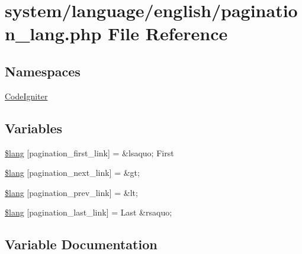 \hypertarget{pagination__lang_8php}{}\section{system/language/english/pagination\+\_\+lang.php File Reference}
\label{pagination__lang_8php}
\subsection*{Namespaces}
\begin{DoxyCompactItemize}
\item 
 \mbox{\hyperlink{namespace_code_igniter}{Code\+Igniter}}
\end{DoxyCompactItemize}
\subsection*{Variables}
\begin{DoxyCompactItemize}
\item 
\mbox{\hyperlink{pagination__lang_8php_a5d1fae944efdc60a9c69d04543723762}{\$lang}} \mbox{[}\textquotesingle{}pagination\+\_\+first\+\_\+link\textquotesingle{}\mbox{]} = \textquotesingle{}\&lsaquo; First\textquotesingle{}
\item 
\mbox{\hyperlink{pagination__lang_8php_aceb23b65e41e7e133a35b2fe48d8fffa}{\$lang}} \mbox{[}\textquotesingle{}pagination\+\_\+next\+\_\+link\textquotesingle{}\mbox{]} = \textquotesingle{}\&gt;\textquotesingle{}
\item 
\mbox{\hyperlink{pagination__lang_8php_a724a9e6ef9da533324d3141faef796e8}{\$lang}} \mbox{[}\textquotesingle{}pagination\+\_\+prev\+\_\+link\textquotesingle{}\mbox{]} = \textquotesingle{}\&lt;\textquotesingle{}
\item 
\mbox{\hyperlink{pagination__lang_8php_a2e62411d434f4b79a8fee1bc0ec04dc5}{\$lang}} \mbox{[}\textquotesingle{}pagination\+\_\+last\+\_\+link\textquotesingle{}\mbox{]} = \textquotesingle{}Last \&rsaquo;\textquotesingle{}
\end{DoxyCompactItemize}


\subsection{Variable Documentation}
\mbox{\label{pagination__lang_8php_a5d1fae944efdc60a9c69d04543723762}} 
